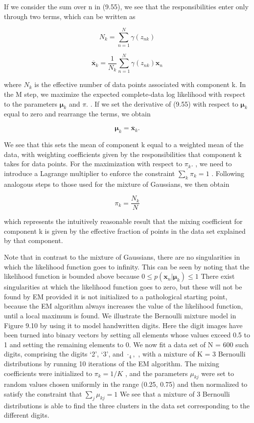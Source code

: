 \documentclass[
  10
]{article}
\begin{document}
If we consider the sum over n in (9.55), we see that the
responsibilities enter only through two terms, which can be written as

\[
N _ {k} = \sum_ {n = 1} ^ {N} \gamma (z _ {n k})\tag{9.57}
\]

\[
{\overline {{\mathbf {x}}} _ {k}} = {\frac {1}{N _ {k}} \sum_ {n = 1} ^ {N} \gamma (z _ {n k}) \mathbf {x} _ {n}}\tag{9.58}
\]

where \(N _ { k }\) is the effective number of data points associated
with component k. In the M step, we maximize the expected complete-data
log likelihood with respect to the parameters \(\pmb { \mu } _ { k }\)
and \(\pi .\) . If we set the derivative of (9.55) with respect to
\(\pmb { \mu } _ { k }\) equal to zero and rearrange the terms, we
obtain

\[
\pmb {\mu} _ {k} = \overline {{\mathbf {x}}} _ {k}.\tag{9.59}
\]

We see that this sets the mean of component k equal to a weighted mean
of the data, with weighting coefficients given by the responsibilities
that component k takes for data points. For the maximization with
respect to \(\pi _ { k } .\) , we need to introduce a Lagrange
multiplier to enforce the constraint
\(\dot { \sum _ { k } } \pi _ { k } = 1\) . Following analogous steps to
those used for the mixture of Gaussians, we then obtain

\[
\pi_ {k} = \frac {N _ {k}}{N}\tag{9.60}
\]

which represents the intuitively reasonable result that the mixing
coefficient for component k is given by the effective fraction of points
in the data set explained by that component.

Note that in contrast to the mixture of Gaussians, there are no
singularities in which the likelihood function goes to infinity. This
can be seen by noting that the likelihood function is bounded above
because
\(0 \leqslant p ( \mathbf x _ { n } | \pmb \mu _ { k } ) \leqslant 1\)
There exist singularities at which the likelihood function goes to zero,
but these will not be found by EM provided it is not initialized to a
pathological starting point, because the EM algorithm always increases
the value of the likelihood function, until a local maximum is found. We
illustrate the Bernoulli mixture model in Figure 9.10 by using it to
model handwritten digits. Here the digit images have been turned into
binary vectors by setting all elements whose values exceed 0.5 to 1 and
setting the remaining elements to 0. We now fit a data set of N = 600
such digits, comprising the digits `2', `3', and \(\cdot _ { 4 } ,\) ,
with a mixture of K = 3 Bernoulli distributions by running 10 iterations
of the EM algorithm. The mixing coefficients were initialized to
\(\pi _ { k } = 1 / K\) , and the parameters \(\mu _ { k j }\) were set
to random values chosen uniformly in the range (0.25, 0.75) and then
normalized to satisfy the constraint that
\(\textstyle \sum _ { j } \mu _ { k j } = 1\) We see that a mixture of 3
Bernoulli distributions is able to find the three clusters in the data
set corresponding to the different digits.
\end{document}
